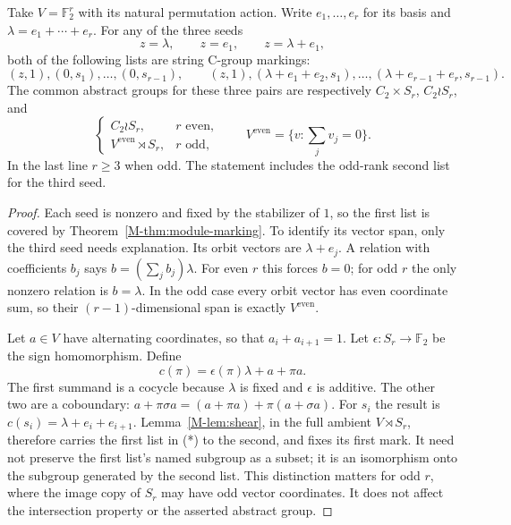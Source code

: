 \begin{proposition}\label{M-prop:signed}
Take $V=\mathbb F_2^r$ with its natural permutation action. Write
$e_1,\ldots,e_r$ for its basis and $\lambda=e_1+\cdots+e_r$. For any
of the three seeds
\[
 z=\lambda,\qquad z=e_1,\qquad z=\lambda+e_1,
\]
both of the following lists are string C-group markings:
\[
 (z,1),(0,s_1),\ldots,(0,s_{r-1}),
 \qquad
 (z,1),(\lambda+e_1+e_2,s_1),\ldots,
       (\lambda+e_{r-1}+e_r,s_{r-1}).                 \tag{*}
\]
The common abstract groups for these three pairs are respectively
$C_2\times S_r$, $C_2\wr S_r$, and
\[
 \begin{cases}
 C_2\wr S_r,&r\text{ even},\\
 V^{\mathrm{even}}\rtimes S_r,&r\text{ odd},
 \end{cases}
 \qquad V^{\mathrm{even}}=\{v:\sum_j v_j=0\}.
\]
In the last line $r\geq3$ when odd. The statement includes the odd-rank
second list for the third seed.
\end{proposition}
\begin{proof}
Each seed is nonzero and fixed by the stabilizer of $1$, so the first
list is covered by Theorem~\ref{M-thm:module-marking}. To identify its vector
span, only the third seed needs explanation. Its orbit vectors are
$\lambda+e_j$. A relation with coefficients $b_j$ says
$b=(\sum_j b_j)\lambda$. For even $r$ this forces $b=0$; for odd $r$
the only nonzero relation is $b=\lambda$. In the odd case every orbit
vector has even coordinate sum, so their $(r-1)$-dimensional span is
exactly $V^{\mathrm{even}}$.

Let $a\in V$ have alternating coordinates, so that $a_i+a_{i+1}=1$.
Let $\epsilon:S_r\to\mathbb F_2$ be the sign homomorphism. Define
\[
 c(\pi)=\epsilon(\pi)\lambda+a+\pi a.
\]
The first summand is a cocycle because $\lambda$ is fixed and
$\epsilon$ is additive. The other two are a coboundary:
$a+\pi\sigma a=(a+\pi a)+\pi(a+\sigma a)$.
For $s_i$ the result is $c(s_i)=\lambda+e_i+e_{i+1}$.
Lemma~\ref{M-lem:shear}, in the full ambient $V\rtimes S_r$, therefore
carries the first list in (*) to the second, and fixes its first mark.
It need not preserve the first list's named subgroup as a subset; it
is an isomorphism onto the subgroup generated by the second list.
This distinction matters for odd $r$, where the image copy of $S_r$
may have odd vector coordinates. It does not affect the intersection
property or the asserted abstract group.
\end{proof}

